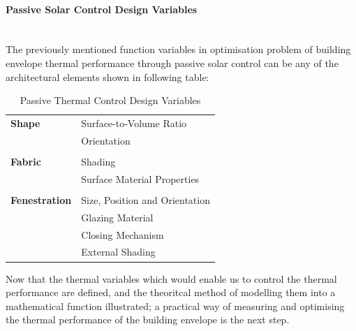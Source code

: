 \documentclass[11pt,a4paper,oneside]{article}
\begin{document}
\begin{multicols}{2}
\paragraph{Passive Solar Control Design Variables}\mbox{}\\

The previously mentioned function variables in optimisation problem of building envelope thermal performance through passive solar control can be any of the architectural elements shown in following table:

\begin{table}[H]
	\centering
	\begin{tabular}{l|l}
		\textbf{Shape}&Surface-to-Volume Ratio\\
		&Orientation\\
		&\\
		\textbf{Fabric}&Shading\\
		&Surface Material Properties\\
		&\\
		\textbf{Fenestration}&Size, Position and Orientation\\
		&Glazing Material\\
		&Closing Mechanism\\
		&External Shading\\
	\end{tabular}
	\caption{Passive Thermal Control Design Variables}
	\label{tab:ThermalDesignVariables}
\end{table}

Now that the thermal variables which would enable us to control the thermal performance are defined, and the theoritcal method of modelling them into a mathematical function illustrated; a practical way of measuring and optimising the thermal performance of the building envelope is the next step. 


\end{multicols}



\end{document}
